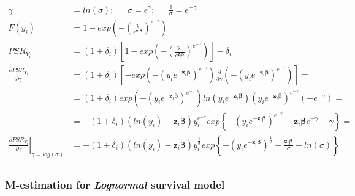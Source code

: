 \documentclass[]{article}
\begin{document}
  $$
  \begin{aligned}
    \gamma &= ln(\sigma);~~~~~~~ \sigma = e^{\gamma};~~~~~~~ \frac{1}{\sigma} = e^{-\gamma}\\
    F(y_i)  &= 1-exp\left(-\left(\frac{y}{e^{\pmb{z}_i\pmb{\beta}}}\right)^{e^{-\gamma}}\right)\\
    PSR_{Y_i} &=  (1+\delta_i) \left[  1-exp\left(-\left(\frac{y_i}{e^{\pmb{z}_i\pmb{\beta}}}\right)^{e^{-\gamma}}\right)    \right]  -  \delta_i\\
    \frac{\partial PSR_{Y_i}}{\partial \gamma} &= (1+\delta_i)   \left[   -exp\left(-\left(y_i e^{-\pmb{z}_i\pmb{\beta}}\right)^{e^{-\gamma}}\right)   \frac{\partial}{\partial \gamma}\left(    -\left(   y_i e^{-\pmb{z}_i\pmb{\beta}}  \right) ^{e^{-\gamma}} \right)   \right] =\\
    & = (1+\delta_i)      exp\left(-\left(y_i e^{-\pmb{z}_i\pmb{\beta}}\right)^{e^{-\gamma}}\right)   ln\left( y_i e^{-\pmb{z}_i\pmb{\beta}}  \right)        \left(   y_i e^{-\pmb{z}_i\pmb{\beta}}  \right) ^{e^{-\gamma}} \left( -e^{-\gamma} \right)   = \\
    & = - (1+\delta_i)   \left(  ln(y_i) -\pmb{z}_i\pmb{\beta}  \right)     y_i ^{e^{-\gamma}} exp \left\{    -\left(y_i e^{-\pmb{z}_i\pmb{\beta}}\right)^{e^{-\gamma}}      -\pmb{z}_i\pmb{\beta}e^{-\gamma}      -\gamma \right\}   = \\
    \left. \frac{\partial PSR_{Y_i}}{\partial \gamma} \right|_{\gamma = log(\sigma)} &= - (1+\delta_i)   \left(  ln(y_i) -\pmb{z}_i\pmb{\beta}  \right)     y_i ^{\frac{1}{\sigma}} exp \left\{    -\left(y_i e^{-\pmb{z}_i\pmb{\beta}}\right)^{\frac{1}{\sigma}}      -\frac{\pmb{z}_i\pmb{\beta}}{\sigma}     -ln(\sigma) \right\}\\
  \end{aligned}
  $$

\subsubsection{M-estimation for \emph{Lognormal} survival model}
\end{document}

